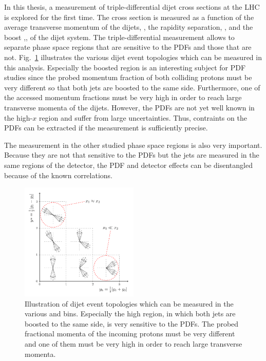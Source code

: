In this thesis, a measurement of triple-differential dijet cross sections at the
LHC is explored for the first time. The cross section is measured as a function
of the average transverse momentum of the dijets, \ptavg, the rapidity
separation, \ystar, and the boost ,\yboost, of the dijet system. The
triple-differential measurement allows to separate phase space regions that are
sensitive to the PDFs and those that are not. Fig.~\ref{fig:intro_ybys_hint}
illustrates the various dijet event topologies which can be measured in this
analysis. Especially the boosted region is an interesting subject for PDF
studies since the probed momentum fraction of both colliding protons must be
very different so that both jets are boosted to the same side. Furthermore, one
of the accessed momentum fractions must be very high in order to reach large
transverse momenta of the dijets. However, the PDFs are not yet well known in
the high-$x$ region and suffer from large uncertainties. Thus, contraints on the
PDFs can be extracted if the measurement is sufficiently precise.

The measurement in the other studied phase space regions is also very important.
Because they are not that sensitive to the PDFs but the jets are measured in the
same regions of the detector, the PDF and detector effects can be disentangled
because of the known correlations.

\begin{figure}
    \centering
    \caption[Illustration of dijet topologies various \ystar and \yboost bins]{
             Illustration of dijet event topologies which can be measured in
             the various \ystar and \yboost bins. Especially the high \yboost region,
             in which both jets are boosted to the same side, is very sensitive to the PDFs. 
             The probed fractional momenta of the incoming protons must be very
             different and one of them must be very high in order to reach large
             transverse momenta.}
    \label{fig:intro_ybys_hint}
    \includegraphics[width=0.5\textwidth]{figures/drawings/ybys_hint.pdf}
\end{figure}

